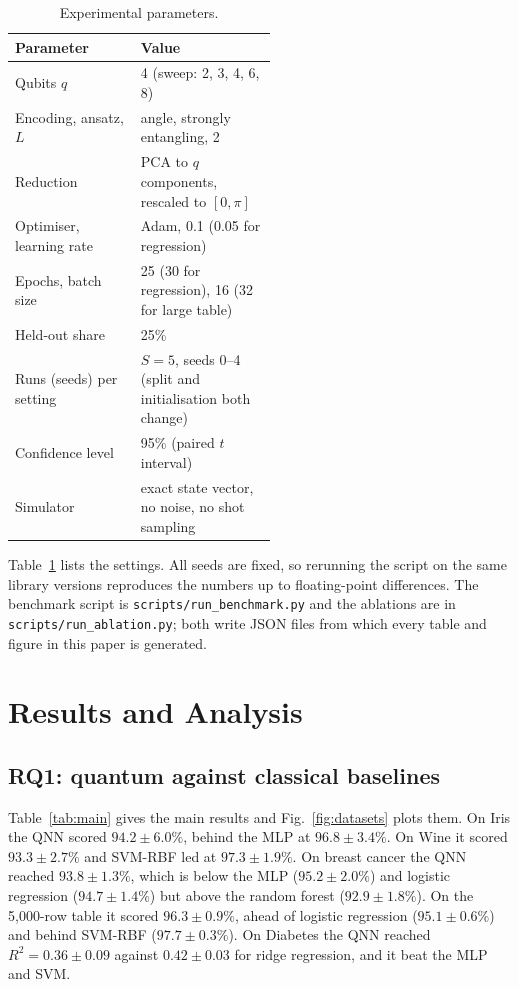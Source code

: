 \documentclass[conference]{IEEEtran}
\begin{document}
\begin{table}[!t]
\caption{Experimental parameters.}
\label{tab:params}
\centering\footnotesize
\begin{tabular}{lp{0.52\linewidth}}
\toprule
Parameter & Value\\
\midrule
Qubits $q$ & 4 (sweep: 2, 3, 4, 6, 8)\\
Encoding, ansatz, $L$ & angle, strongly entangling, 2\\
Reduction & PCA to $q$ components, rescaled to $[0,\pi]$\\
Optimiser, learning rate & Adam, 0.1 (0.05 for regression)\\
Epochs, batch size & 25 (30 for regression), 16 (32 for large table)\\
Held-out share & 25\%\\
Runs (seeds) per setting & $S=5$, seeds 0--4 (split and initialisation both change)\\
Confidence level & 95\% (paired $t$ interval)\\
Simulator & exact state vector, no noise, no shot sampling\\
\bottomrule
\end{tabular}
\end{table}

Table~\ref{tab:params} lists the settings. All seeds are fixed, so rerunning the script on the same library versions reproduces the numbers up to floating-point differences. The benchmark script is \texttt{scripts/run\_benchmark.py} and the ablations are in \texttt{scripts/run\_ablation.py}; both write JSON files from which every table and figure in this paper is generated.

\section{Results and Analysis}
\subsection{RQ1: quantum against classical baselines}
Table~\ref{tab:main} gives the main results and Fig.~\ref{fig:datasets} plots them. On Iris the QNN scored $94.2\pm6.0\%$, behind the MLP at $96.8\pm3.4\%$. On Wine it scored $93.3\pm2.7\%$ and SVM-RBF led at $97.3\pm1.9\%$. On breast cancer the QNN reached $93.8\pm1.3\%$, which is below the MLP ($95.2\pm2.0\%$) and logistic regression ($94.7\pm1.4\%$) but above the random forest ($92.9\pm1.8\%$). On the 5,000-row table it scored $96.3\pm0.9\%$, ahead of logistic regression ($95.1\pm0.6\%$) and behind SVM-RBF ($97.7\pm0.3\%$). On Diabetes the QNN reached $R^2=0.36\pm0.09$ against $0.42\pm0.03$ for ridge regression, and it beat the MLP and SVM.
\end{document}
